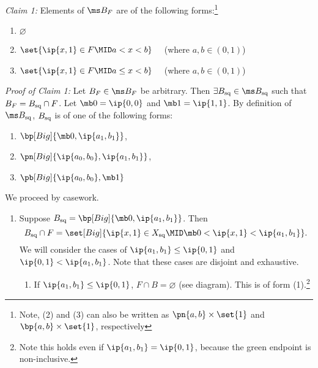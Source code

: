 \documentclass{fkpset}
\newcommand{\sq}{{\rm sq}}
\begin{document}
\begin{solution}
    \emph{Claim 1:} Elements of $\ms B_F$ are of the following
    forms:\footnote{Note, (2) and (3) can also be written as $\pn{a,b}
      \times \set{1}$ and $\bp{a,b} \times \set{1}$,
      respectively}
    \begin{enumerate}[label=(\arabic*)]
      \item $\varnothing$
      \item $\set{\ip{x,1} \in F \MID a < x < b}\quad$ (where $a,b \in
        (0,1)$)
      \item $\set{\ip{x,1} \in F \MID a \leq x < b}\quad$ (where $a,b
        \in (0,1)$)
    \end{enumerate}
    \emph{Proof of Claim 1:} Let $B_F \in \ms B_F$ be arbitrary. Then
    $\exists B_\sq \in \ms B_\sq$ such that $B_F = B_\sq \cap F$. Let
    $\mb 0 = \ip{0,0}$ and $\mb 1 = \ip{1,1}$. By definition of $\ms
    B_\sq$, $B_\sq$ is of one of the following forms:\clearpage
    \begin{enumerate}
      \item $\bp[Big]{\mb 0, \ip{a_1, b_1}}$,
      \item $\pn[Big]{\ip{a_0, b_0}, \ip{a_1, b_1}}$,
      \item $\pb[Big]{\ip{a_0, b_0}, \mb 1}$
    \end{enumerate}
    We proceed by casework.
    \begin{enumerate}
      \item Suppose $B_\sq = \bp[Big]{\mb 0, \ip{a_1, b_1}}$. Then
        \[
          B_\sq \cap F = \set[Big]{\ip{x,1} \in X_\sq \MID \mb 0 <
            \ip{x,1} < \ip{a_1, b_1}}.
        \]
        We will consider the cases of $\ip{a_1,b_1} \leq \ip{0,1}$ and
        $\ip{0,1} < \ip{a_1,b_1}$. Note that these cases are disjoint
        and exhaustive.
        \begin{enumerate}[label=\roman*)]
          \item If $\ip{a_1,b_1} \leq \ip{0,1}$, $F \cap B =
            \varnothing$ (see diagram). This is of form
            (1).\footnote{Note this holds even if $\ip{a_1,b_1} =
              \ip{0,1}$, because the green endpoint is non-inclusive.}
            \begin{figure}[H]
              \centering
\end{figure}
\end{enumerate}
\end{enumerate}
\end{solution}
\end{document}
